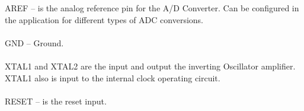 \documentclass[english]{article}
\begin{document}
AREF – is the analog reference pin for the A/D Converter. Can be configured in the application for different types of ADC conversions.\\\\
GND – Ground.\\\\
XTAL1 and XTAL2 are the input and output the inverting Oscillator amplifier. XTAL1 also is input to the internal clock operating circuit.\\\\
RESET – is the reset input.
\end{document}
